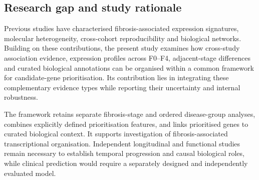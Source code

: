\subsection*{Research gap and study rationale}
Previous studies have characterised fibrosis-associated expression signatures, molecular heterogeneity, cross-cohort reproducibility and biological networks. Building on these contributions, the present study examines how cross-study association evidence, expression profiles across F0--F4, adjacent-stage differences and curated biological annotations can be organised within a common framework for candidate-gene prioritisation. Its contribution lies in integrating these complementary evidence types while reporting their uncertainty and internal robustness.

The framework retains separate fibrosis-stage and ordered disease-group analyses, combines explicitly defined prioritisation features, and links prioritised genes to curated biological context. It supports investigation of fibrosis-associated transcriptional organisation. Independent longitudinal and functional studies remain necessary to establish temporal progression and causal biological roles, while clinical prediction would require a separately designed and independently evaluated model.

